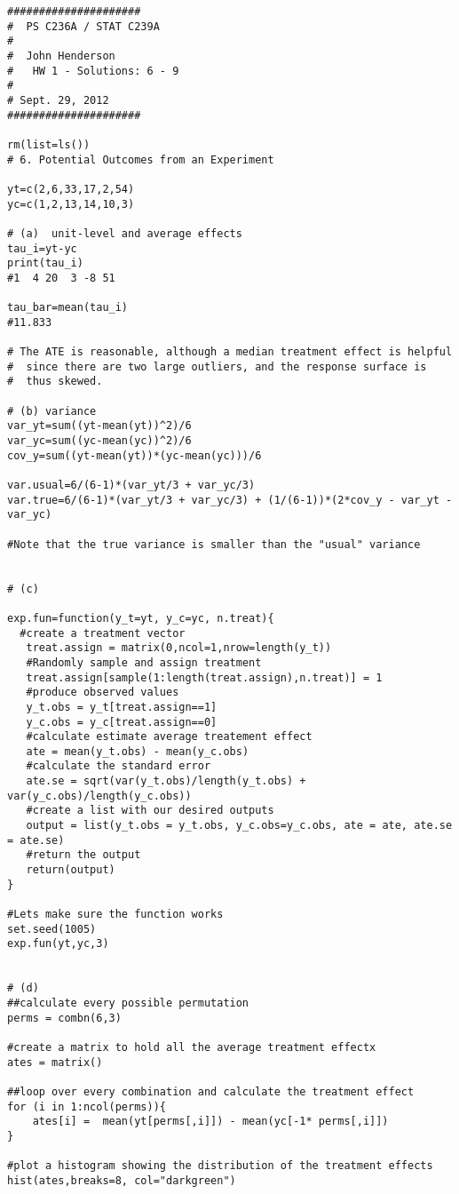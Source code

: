 \documentclass{article}
\begin{document}
 \newpage
\begin{verbatim}
#####################
#  PS C236A / STAT C239A 
#
#  John Henderson
#   HW 1 - Solutions: 6 - 9
#
# Sept. 29, 2012      
#####################
    
rm(list=ls())
# 6. Potential Outcomes from an Experiment 

yt=c(2,6,33,17,2,54)
yc=c(1,2,13,14,10,3) 
     
# (a)  unit-level and average effects 
tau_i=yt-yc     
print(tau_i)
#1  4 20  3 -8 51

tau_bar=mean(tau_i)
#11.833

# The ATE is reasonable, although a median treatment effect is helpful
#  since there are two large outliers, and the response surface is 
#  thus skewed.

# (b) variance 
var_yt=sum((yt-mean(yt))^2)/6
var_yc=sum((yc-mean(yc))^2)/6
cov_y=sum((yt-mean(yt))*(yc-mean(yc)))/6  

var.usual=6/(6-1)*(var_yt/3 + var_yc/3)
var.true=6/(6-1)*(var_yt/3 + var_yc/3) + (1/(6-1))*(2*cov_y - var_yt - var_yc)      

#Note that the true variance is smaller than the "usual" variance


# (c)

exp.fun=function(y_t=yt, y_c=yc, n.treat){
  #create a treatment vector
   treat.assign = matrix(0,ncol=1,nrow=length(y_t))
   #Randomly sample and assign treatment
   treat.assign[sample(1:length(treat.assign),n.treat)] = 1
   #produce observed values
   y_t.obs = y_t[treat.assign==1]
   y_c.obs = y_c[treat.assign==0]
   #calculate estimate average treatement effect
   ate = mean(y_t.obs) - mean(y_c.obs)
   #calculate the standard error
   ate.se = sqrt(var(y_t.obs)/length(y_t.obs) + var(y_c.obs)/length(y_c.obs))
   #create a list with our desired outputs
   output = list(y_t.obs = y_t.obs, y_c.obs=y_c.obs, ate = ate, ate.se = ate.se)
   #return the output
   return(output)
}

#Lets make sure the function works
set.seed(1005)
exp.fun(yt,yc,3)


# (d)
##calculate every possible permutation
perms = combn(6,3)

#create a matrix to hold all the average treatment effectx
ates = matrix()

##loop over every combination and calculate the treatment effect
for (i in 1:ncol(perms)){
	ates[i] =  mean(yt[perms[,i]]) - mean(yc[-1* perms[,i]]) 
}

#plot a histogram showing the distribution of the treatment effects
hist(ates,breaks=8, col="darkgreen")


\end{verbatim}
\end{document}
